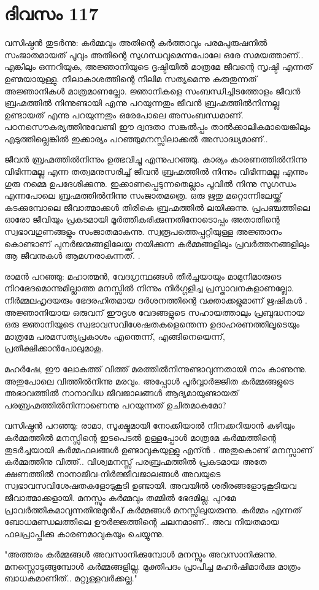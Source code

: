  
\section{ദിവസം 117}


വസിഷ്ഠന്‍ തുടര്‍ന്നു: കര്‍മ്മവും അതിന്റെ കര്‍ത്താവും പരമപുരുഷനില്‍ സംജാതമായത്‌ പൂവും അതിന്റെ സുഗന്ധവുമെന്നപോലേ ഒരേ സമയത്താണ്‌.. എങ്കിലും ഒന്നറിയുക, അജ്ഞാനിയുടെ ദൃഷ്ടിയില്‍ മാത്രമേ ജീവന്റെ സൃഷ്ടി എന്നത്‌ ഉണ്മയായുള്ളു. നീലാകാശത്തിന്റെ നീലിമ സത്യമെന്നു കരുതുന്നത്‌ അജ്ഞാനികള്‍ മാത്രമാണല്ലോ. ജ്ഞാനികളെ സംബന്ധിച്ചിടത്തോളം ജീവന്‍ ബ്രഹ്മത്തില്‍ നിന്നുണ്ടായി എന്നു പറയുന്നതും ജീവന്‍ ബ്രഹ്മത്തില്‍നിന്നല്ല ഉണ്ടായത്‌ എന്നു പറയുന്നതും ഒരേപോലെ അസംബന്ധമാണ്‌. പഠനസൌകര്യത്തിനുവേണ്ടി ഈ ദ്വന്ദതാ സങ്കല്‍പ്പം താല്‍ക്കാലികമായെങ്കിലും എടുത്തില്ലെങ്കില്‍ ഇക്കാര്യം പറഞ്ഞുമനസ്സിലാക്കല്‍ അസാദ്ധ്യമാണ്‌..

ജീവന്‍ ബ്രഹ്മത്തില്‍നിന്നും ഉത്ഭവിച്ചു എന്നുപറഞ്ഞു. കാര്യം കാരണത്തില്‍നിന്നു വിഭിന്നമല്ല എന്ന തത്വമനുസരിച്ച്‌ ജീവന്‍ ബ്രഹ്മത്തില്‍ നിന്നും വിഭിന്നമല്ല എന്നും ഗുരു നമ്മെ ഉപദേശിക്കുന്നു. ഇക്കാണപ്പെടുന്നതെല്ലാം പൂവില്‍ നിന്നു സുഗന്ധം എന്നപോലെ ബ്രഹ്മത്തില്‍നിന്നു സംജാതമത്രെ. ഒരു ഋതു മറ്റൊന്നിലേയ്ക്ക്‌ കടക്കുമ്പോലെ ജീവാത്മാക്കള്‍ തിരികെ ബ്രഹ്മത്തില്‍ ലയിക്കുന്നു. പ്രപഞ്ചത്തിലെ ഓരോ ജീവിയും പ്രകടമായി മൂര്‍ത്തീകരിക്കുന്നതിനോടൊപ്പം അതാതിന്റെ സ്വഭാവഗുണങ്ങളും സംജാതമാകുന്നു. സ്വരൂപത്തെപ്പറ്റിയുള്ള അജ്ഞാനം കൊണ്ടാണ്‌ പുനര്‍ജന്മങ്ങളിലേയ്ക്കു നയിക്കുന്ന കര്‍മ്മങ്ങളിലും പ്രവര്‍ത്തനങ്ങളിലും ആ ജീവനുകള്‍ ആമഗ്നരാകുന്നത്‌. .

രാമന്‍ പറഞ്ഞു: മഹാത്മന്‍, വേദഗ്രന്ഥങ്ങള്‍ തീര്‍ച്ചയായും മാമുനിമാരുടെ നിറഭേദമൊന്നുമില്ലാത്ത മനസ്സില്‍ നിന്നും നിര്‍ഗ്ഗളിച്ച പ്രസ്താവനകളാണല്ലോ. നിര്‍മ്മലഹൃദയരും ഭേദരഹിതമായ ദര്‍ശനത്തിന്റെ വക്താക്കളുമാണ്‌ ഋഷികള്‍ .  അജ്ഞാനിയായ ഒരുവന്‌ ഈദൃശ വേദങ്ങളുടെ സഹായത്താലും പ്രബുദ്ധനായ ഒരു ജ്ഞാനിയുടെ സ്വഭാവസവിശേഷതകളെന്തെന്ന ഉദാഹരണത്തിലൂടെയും മാത്രമേ പരമസത്യപ്രകാശം എന്തെന്ന്, എങ്ങിനെയെന്ന്, പ്രതീക്ഷിക്കാന്‍പോലുമാകൂ.

മഹര്‍ഷേ, ഈ ലോകത്ത്‌ വിത്ത്‌ മരത്തില്‍നിന്നുണ്ടാവുന്നതായി നാം കാണുന്നു. അതുപോലെ വിത്തില്‍നിന്നു മരവും. അപ്പോള്‍ പൂര്‍വ്വാര്‍ജ്ജിത കര്‍മ്മങ്ങളുടെ അഭാവത്തില്‍ നാനാവിധ ജീവജാലങ്ങള്‍ ആദ്യമായുണ്ടായത്‌ പരബ്രഹ്മത്തില്‍നിന്നാണെന്നു പറയുന്നത്‌ ഉചിതമാകുമോ?

വസിഷ്ഠന്‍ പറഞ്ഞു: രാമാ, സൂക്ഷ്മമായി നോക്കിയാല്‍ നിനക്കറിയാന്‍ കഴിയും കര്‍മ്മത്തില്‍ മനസ്സിന്റെ ഇടപെടല്‍ ഉള്ളപ്പോള്‍ മാത്രമേ കര്‍മ്മത്തിന്റെ തുടര്‍ച്ചയായി കര്‍മ്മഫലങ്ങള്‍ ഉണ്ടാവുകയുള്ളു എന്ന്‍ . അതുകൊണ്ട്‌ മനസ്സാണ്‌ കര്‍മ്മത്തിനു വിത്ത്‌.. വിശ്വമനസ്സ്‌ പരബ്രഹ്മത്തില്‍ പ്രകടമായ അതേ ക്ഷണത്തില്‍ നാനാജീവ-നിര്‍ജ്ജീവജാലങ്ങള്‍ അവയുടെ സ്വഭാവസവിശേഷതകളോടുകൂടി ഉണ്ടായി. അവയില്‍ ശരീരങ്ങളോടുകൂടിയവ ജീവാത്മാക്കളായി. മനസ്സും കര്‍മ്മവും തമ്മില്‍ ഭേദമില്ല. പുറമേ പ്രാവര്‍ത്തികമാവുന്നതിനുമുന്‍പ്‌ കര്‍മ്മങ്ങള്‍ മനസ്സിലുയരുന്നു. കര്‍മ്മം എന്നത്‌ ബോധമണ്ഡലത്തിലെ ഊര്‍ജ്ജത്തിന്റെ ചലനമാണ്‌.. അവ നിയതമായ ഫലപ്രാപ്തിക്കു കാരണമാവുകയും ചെയ്യുന്നു.

"അത്തരം കര്‍മ്മങ്ങള്‍ അവസാനിക്കുമ്പോള്‍ മനസ്സും അവസാനിക്കുന്നു. മനസ്സൊടുങ്ങുമ്പോള്‍ കര്‍മ്മങ്ങളില്ല. മുക്തിപദം പ്രാപിച്ച മഹര്‍ഷിമാര്‍ക്കു മാത്രം ബാധകമാണിത്‌.. മറ്റുള്ളവര്‍ക്കല്ല."

